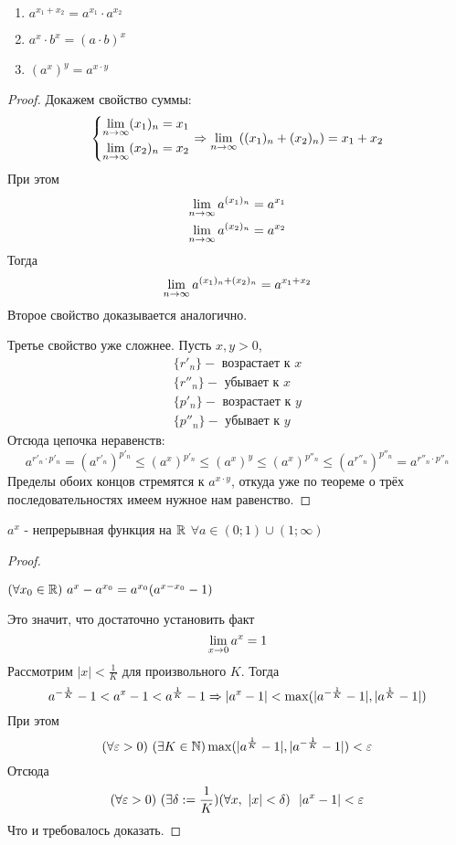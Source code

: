 \begin{enumerate}
	\item $a^{x_1 + x_2} = a^{x_1} \cdot a^{x_2}$
	\item $a^x \cdot b^x = (a \cdot b)^x$
	\item $(a^x)^y = a^{x \cdot y}$
\end{enumerate}

\begin{proof}
	Докажем свойство суммы:
	\[
		\left\{\begin{aligned}
		\lim\limits_{n \to \infty} (x_1)_n = x_1
		\\
		\lim\limits_{n \to \infty} (x_2)_n = x_2
		\end{aligned}\right.
		\Rightarrow
		\lim\limits_{n \to \infty} \left((x_1)_n + (x_2)_n\right) = x_1 + x_2
	\]
	При этом
	\begin{align*}
		\lim\limits_{n \to \infty} a^{(x_1)_n} = a^{x_1}
		\\
		\lim\limits_{n \to \infty} a^{(x_2)_n} = a^{x_2}
	\end{align*}
	Тогда
	\[
		\lim\limits_{n \to \infty} a^{(x_1)_n + (x_2)_n} = a^{x_1 + x_2}
	\]
	Второе свойство доказывается аналогично.
	
	Третье свойство уже сложнее. Пусть $x, y > 0$,
	\begin{align*}
		\{r'_n\} - \text{ возрастает к } x
		\\
		\{r''_n\} - \text{ убывает к } x
		\\
		\{p'_n\} - \text{ возрастает к } y
		\\
		\{p''_n\} - \text{ убывает к } y
	\end{align*}
	Отсюда цепочка неравенств:
	\[
		a^{r'_n \cdot p'_n} = (a^{r'_n})^{p'_n} \le (a^x)^{p'_n} \le (a^x)^y \le (a^x)^{p''_n} \le (a^{r''_n})^{p''_n} = a^{r''_n \cdot p''_n}
	\]
	Пределы обоих концов стремятся к $a^{x \cdot y}$, откуда уже по теореме о трёх последовательностях имеем нужное нам равенство.
\end{proof}

\begin{theorem}
	$a^x$ - непрерывная функция на $\mathbb{R}$ $\forall a \in (0; 1) \cup (1; \infty)$
\end{theorem}

\begin{proof}~
	
	$(\forall x_0 \in \mathbb{R})~a^x - a^{x_0} = a^{x_0}(a^{x - x_0} - 1)$
	
	Это значит, что достаточно установить факт
	\[
		\lim\limits_{x \to 0} a^x = 1
	\]
	Рассмотрим $|x| < \frac{1}{K}$ для произвольного $K$. Тогда
	\[
		a^{-\frac{1}{K}} - 1 < a^x - 1 < a^{\frac{1}{K}} - 1 \Rightarrow |a^x - 1| < \max(|a^{-\frac{1}{K}} - 1|, |a^{\frac{1}{K}} - 1|)
	\]
	При этом
	\[
		(\forall \varepsilon > 0)\ (\exists K \in \mathbb{N})  \max(|a^{\frac{1}{K}} - 1|, |a^{-\frac{1}{K}} - 1|) < \varepsilon
	\]
	Отсюда
	\[
		(\forall \eps > 0)\ (\exists \delta := \frac{1}{K}) (\forall x,\ |x| < \delta)\ \ |a^x - 1| < \eps
	\]
	Что и требовалось доказать.
\end{proof}

